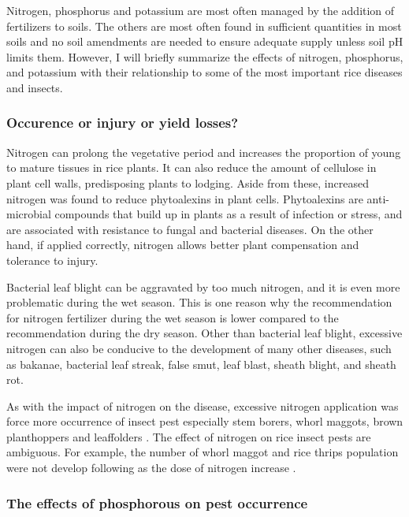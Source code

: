 Nitrogen, phosphorus and potassium are most often managed by the addition of fertilizers to soils. The others are most often found in sufficient quantities in most soils and no soil amendments are needed to ensure adequate supply unless soil pH limits them. However, I will briefly summarize the effects of nitrogen, phosphorus, and potassium with their relationship to some of the most important rice diseases and insects.

\subsubsection{Occurence or injury or yield losses?}

Nitrogen can prolong the vegetative period and increases the proportion of young to mature tissues in rice plants. It can also reduce the amount of cellulose in plant cell walls, predisposing plants to lodging. Aside from these, increased nitrogen was found to reduce phytoalexins in plant cells. Phytoalexins are anti-microbial compounds that build up in plants as a result of infection or stress, and are associated with resistance to fungal and bacterial diseases. On the other hand, if applied correctly, nitrogen allows better plant compensation and tolerance to injury.

Bacterial leaf blight can be aggravated by too much nitrogen, and it is even more problematic during the wet season. This is one reason why the recommendation for nitrogen fertilizer during the wet season is lower compared to the recommendation during the dry season. Other than bacterial leaf blight, excessive nitrogen can also be conducive to the development of many other diseases, such as bakanae, bacterial leaf streak, false smut, leaf blast, sheath blight, and sheath rot.

As with the impact of nitrogen on the disease, excessive nitrogen application was force more occurrence of insect pest especially stem borers, whorl maggots, brown planthoppers and leaffolders \citep{Chau_2003_Impacts, Litsinger_2011_Cultural, Rashid_2014_Effect}. The effect of nitrogen on rice insect pests are ambiguous. For example, the number of whorl maggot and rice thrips population were not develop following as the dose of nitrogen increase \citep{Chau_2003_Impacts}.

\subsubsection{The effects of phosphorous on pest occurrence}

